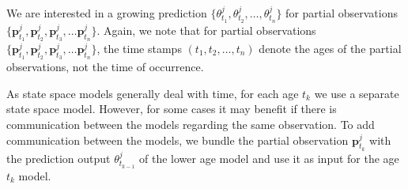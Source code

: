 \documentclass[a4paper,11pt]{article}
\begin{document}
We are interested in a growing prediction $\{\theta^j_{t_1}, \theta^j_{t_2}, \ldots, \theta^j_{t_n} \}$ for partial observations $\{\bm{p}^j_{t_1},\bm{p}^j_{t_2}, \bm{p}^j_{t_3}, \ldots \bm{p}^j_{t_n}\}$. Again, we note that for partial observations $\{\bm{p}^j_{t_1},\bm{p}^j_{t_2}, \bm{p}^j_{t_3}, \ldots \bm{p}^j_{t_n}\}$, the time stamps $(t_1, t_2, \ldots, t_n)$ denote the ages of the partial observations, not the time of occurrence. %

As state space models generally deal with time, for each age $t_k$ we use a separate state space model. However, for some cases it may benefit if there is communication between the models regarding the same observation. To add communication between the models, we bundle the partial observation $\bm{p}^j_{t_k}$ with the prediction output $\theta^j_{t_{k-1}}$ of the lower age model and use it as input for the age $t_k$ model. %
\end{document}
